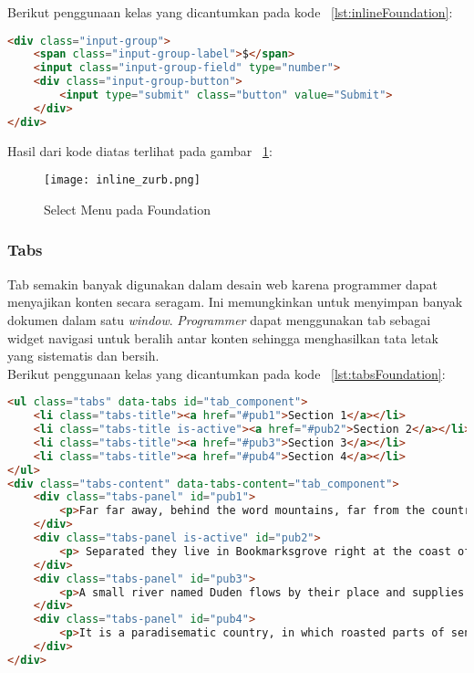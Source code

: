 \noindent Berikut penggunaan kelas yang dicantumkan pada kode ~\ref{lst:inlineFoundation}:
\begin{lstlisting}[style=customhtml, language=HTML,  basicstyle=\ttfamily, frame=single, columns=fullflexible, keepspaces=true, breaklines=true, showstringspaces=false, label={lst:inlineFoundation}, caption=Select menus pada foundation 6.] 
<div class="input-group">
	<span class="input-group-label">$</span>
	<input class="input-group-field" type="number">
	<div class="input-group-button">
		<input type="submit" class="button" value="Submit">
	</div>
</div>
\end{lstlisting}

\noindent Hasil dari kode diatas terlihat pada gambar ~\ref{fig:inlineFoundation}:
\begin{figure} [H]
	\centering  
	\texttt{[image: inline\_zurb.png]}  
	\caption{Select Menu pada Foundation}
	\label{fig:inlineFoundation}
\end{figure}

\subsubsection{Tabs}
Tab semakin banyak digunakan dalam desain web karena programmer dapat menyajikan konten secara seragam. Ini memungkinkan untuk menyimpan banyak dokumen dalam satu \textit{window}. \textit{Programmer} dapat menggunakan tab sebagai widget navigasi untuk beralih antar konten sehingga menghasilkan tata letak yang sistematis dan bersih.\\

\noindent Berikut penggunaan kelas yang dicantumkan pada kode ~\ref{lst:tabsFoundation}:
\begin{lstlisting}[style=customhtml, language=HTML,  basicstyle=\ttfamily, frame=single, columns=fullflexible, keepspaces=true, breaklines=true, showstringspaces=false, label={lst:tabsFoundation}, caption=Tabs pada foundation 6.] 
<ul class="tabs" data-tabs id="tab_component">
	<li class="tabs-title"><a href="#pub1">Section 1</a></li>
	<li class="tabs-title is-active"><a href="#pub2">Section 2</a></li>
	<li class="tabs-title"><a href="#pub3">Section 3</a></li>
	<li class="tabs-title"><a href="#pub4">Section 4</a></li>
</ul>
<div class="tabs-content" data-tabs-content="tab_component">
	<div class="tabs-panel" id="pub1">
		<p>Far far away, behind the word mountains, far from the countries Vokalia and Consonantia, there live the blind texts.</p>
	</div>
	<div class="tabs-panel is-active" id="pub2">
		<p> Separated they live in Bookmarksgrove right at the coast of the	Semantics, a large language ocean. </p>
	</div>
	<div class="tabs-panel" id="pub3">
		<p>A small river named Duden flows by their place and supplies it with the necessary regelialia.</p>
	</div>
	<div class="tabs-panel" id="pub4">
		<p>It is a paradisematic country, in which roasted parts of sentences fly into your mouth. </p>
	</div>
</div>
\end{lstlisting}

